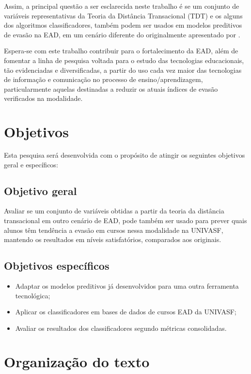Assim, a principal questão a ser esclarecida neste trabalho é se um conjunto de
variáveis representativas da Teoria da Distância Transacional (TDT) e os alguns
dos algoritmos classificadores, também podem ser usados em modelos preditivos de
evasão na EAD, em um cenário diferente do originalmente apresentado por
.

Espera-se com este trabalho contribuir para o fortalecimento da EAD, além de
fomentar a linha de pesquisa voltada para o estudo das tecnologias educacionais,
tão evidenciadas e diversificadas, a partir do uso cada vez maior das
tecnologias de informação e comunicação no processo de ensino/aprendizagem,
particularmente aquelas destinadas a reduzir os atuais índices de evasão
verificados na modalidade.

\section{Objetivos}

Esta pesquisa será desenvolvida com o propósito de atingir os seguintes
objetivos geral e específicos:

\subsection{Objetivo geral}

Avaliar se um conjunto de variáveis obtidas a partir da teoria da distância
transacional em outro cenário de EAD, pode também ser usado para prever quais
alunos têm tendência a evasão em cursos nessa modalidade na UNIVASF, mantendo os
resultados em níveis satisfatórios, comparados aos originais.

\subsection{Objetivos específicos}
\begin{itemize}
  \item Adaptar os modelos preditivos já desenvolvidos para uma outra ferramenta
  tecnológica;
  \item Aplicar os classificadores em bases de dados de cursos EAD da UNIVASF;
  \item Avaliar os resultados dos classificadores segundo métricas consolidadas.
\end{itemize}

\section{Organização do texto}

